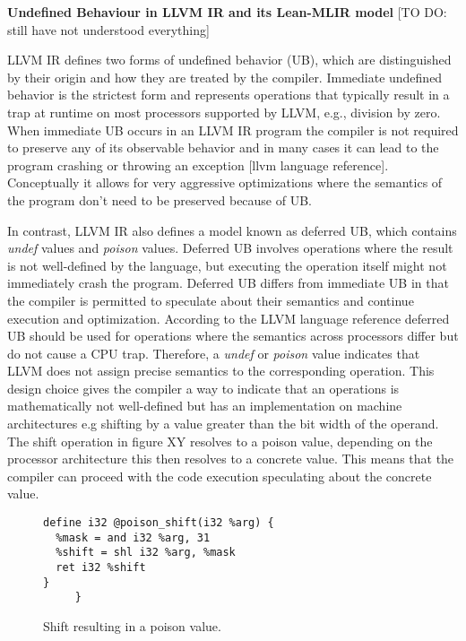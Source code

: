 \textbf{Undefined Behaviour in LLVM IR and its Lean-MLIR model }[TO DO: still have not understood everything]

LLVM IR defines two forms of undefined behavior (UB), which are distinguished by their origin and how they are treated by the compiler. Immediate undefined behavior is the strictest form and represents operations that typically result in a trap at runtime on most processors supported by LLVM, e.g., division by zero. When immediate UB occurs in an LLVM IR program the compiler is not required to preserve any of its observable behavior and in many cases it can lead to the program crashing or throwing an exception [llvm language reference]. Conceptually it allows for very aggressive optimizations where the semantics of the program don't need to be preserved because of UB.

In contrast, LLVM IR also defines a model known as deferred UB, which contains \textit{undef} values and \textit{poison} values. Deferred UB involves operations where the result is not well-defined by the language, but executing the operation itself might not immediately crash the program. Deferred UB differs from immediate UB in that the compiler is permitted to speculate about their semantics and continue execution and optimization. According to the LLVM language reference deferred UB should be used for operations where the semantics across processors differ but do not cause a CPU trap. Therefore, a \textit{ undef} or \textit{poison} value indicates that LLVM does not assign precise semantics to the corresponding operation. This design choice gives the compiler a way to indicate that an operations is mathematically not well-defined but has an implementation on machine architectures e.g  shifting by a value greater than the bit width of the operand. The shift operation in figure XY resolves to a poison value, depending on the processor architecture this then resolves to a concrete value. This means that the compiler can proceed with the code execution speculating about the concrete value.
\begin{figure}
\begin{minipage}{0.45\textwidth}
\begin{lstlisting}
define i32 @poison_shift(i32 %arg) {
  %mask = and i32 %arg, 31
  %shift = shl i32 %arg, %mask
  ret i32 %shift
}
     }
\end{lstlisting}
\end{minipage}
\caption{Shift resulting in a poison value.}
\label{fig:LLVMIR-SEMANTICS-SHL}
\end{figure}

